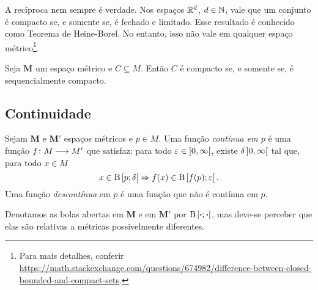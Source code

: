 A recíproca nem sempre é verdade. Nos espaços $\mathbb{R}^d$, $ d \in \mathbb{N}$, vale que um conjunto é compacto se, e somente se, é fechado e limitado. Esse resultado é conhecido como Teorema de Heine-Borel. No entanto, isso não vale em qualquer espaço métrico\footnote{Para mais detalhes, conferir \url{https://math.stackexchange.com/questions/674982/difference-between-closed-bounded-and-compact-sets}.}.

\begin{exercise}
Seja $\bm M$ um espaço métrico e $C \subseteq M$. Então $C$ é compacto se, e somente se, é sequencialmente compacto.
\end{exercise}

\subsection{Continuidade}

\begin{definition}
Sejam $\bm M$ e $\bm M'$ espaços métricos e $p \in M$. Uma função \emph{contínua em $p$} é uma função ${f}\colon {M} \longrightarrow {M'}$ que satisfaz: para todo $\varepsilon \in \left]{0},{\infty}\right[$, existe $\delta \left]{0},{\infty}\right[$ tal que, para todo $x \in M$
	\begin{equation*}
	x \in \mathrm{B}\left[{p};{\delta}\right[ \Rightarrow f(x) \in \mathrm{B}\left[{f(p)};{\varepsilon}\right[.
	\end{equation*}
Uma função \emph{descontínua} em $p$ é uma função que não é contínua em $p$.
\end{definition}

Denotamos as bolas abertas em $\bm M$ e em $\bm M'$ por $\mathrm{B}\left[{\bm{\cdot}};{\bm{\cdot}}\right[$, mas deve-se perceber que elas são relativas a métricas possivelmente diferentes.


